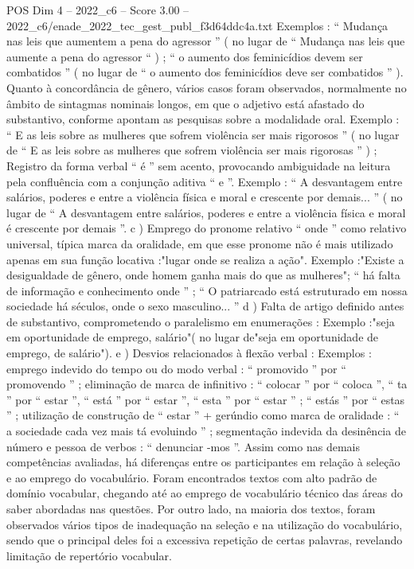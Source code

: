 \begin{textsample}{POS Dim 4 – 2022\_c6 – Score 3.00 – 2022\_c6/enade\_2022\_tec\_gest\_publ\_f3d64ddc4a.txt}
Exemplos : “ Mudança nas leis que aumentem a pena do agressor ” ( no lugar de “ Mudança nas leis que aumente a pena do agressor “ ) ; “ o aumento dos feminicídios devem ser combatidos ” ( no lugar de “ o aumento dos feminicídios deve ser combatidos ” ).
Quanto à concordância de gênero, vários casos foram observados, normalmente no âmbito de sintagmas nominais longos, em que o adjetivo está afastado do substantivo, conforme apontam as pesquisas sobre a modalidade oral.
Exemplo : “ E as leis sobre as mulheres que sofrem violência ser mais rigorosos ” ( no lugar de “ E as leis sobre as mulheres que sofrem violência ser mais rigorosas ” ) ; Registro da forma verbal “ é ” sem acento, provocando ambiguidade na leitura pela confluência com a conjunção aditiva “ e ”.
Exemplo : “ A desvantagem entre salários, poderes e entre a violência física e moral e crescente por demais... ” ( no lugar de “ A desvantagem entre salários, poderes e entre a violência física e moral é crescente por demais ”. c ) Emprego do pronome relativo “ onde ” como relativo universal, típica marca da oralidade, em que esse pronome não é mais utilizado apenas em sua função locativa :"lugar onde se realiza a ação".
Exemplo :"Existe a desigualdade de gênero, onde homem ganha mais do que as mulheres"; “ há falta de informação e conhecimento onde ” ; “ O patriarcado está estruturado em nossa sociedade há séculos, onde o sexo masculino... ” d ) Falta de artigo definido antes de substantivo, comprometendo o paralelismo em enumerações : Exemplo :"seja em oportunidade de emprego, salário"( no lugar de"seja em oportunidade de emprego, de salário"). e ) Desvios relacionados à flexão verbal : Exemplos : emprego indevido do tempo ou do modo verbal : “ promovido ” por “ promovendo ” ; eliminação de marca de infinitivo : “ colocar ” por “ coloca ”, “ ta ” por “ estar ”, “ está ” por “ estar ”, “ esta ” por “ estar ” ; “ estás ” por “ estas ” ; utilização de construção de “ estar ” + gerúndio como marca de oralidade : “ a sociedade cada vez mais tá evoluindo ” ; segmentação indevida da desinência de número e pessoa de verbos : “ denunciar -mos ”.
Assim como nas demais competências avaliadas, há diferenças entre os participantes em relação à seleção e ao emprego do vocabulário.
Foram encontrados textos com alto padrão de domínio vocabular, chegando até ao emprego de vocabulário técnico das áreas do saber abordadas nas questões.
Por outro lado, na maioria dos textos, foram observados vários tipos de inadequação na seleção e na utilização do vocabulário, sendo que o principal deles foi a excessiva repetição de certas palavras, revelando limitação de repertório vocabular.

\end{textsample}
